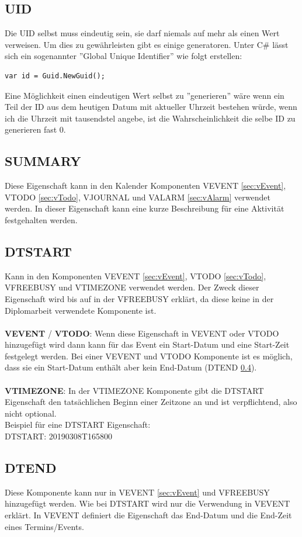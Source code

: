 \subsection{UID}
\label{sec:uid}
Die UID selbst muss eindeutig sein, sie darf niemals auf mehr als einen Wert verweisen. Um dies zu gewährleisten gibt es einige generatoren. Unter C\# lässt sich ein sogenannter ''Global Unique Identifier'' wie folgt erstellen: \\
\begin{lstlisting}[caption=GUID in C\#, label=lst:test]
var id = Guid.NewGuid(); 
\end{lstlisting}
Eine Möglichkeit einen eindeutigen Wert selbst zu ''generieren'' wäre wenn ein Teil der ID aus dem heutigen Datum mit aktueller Uhrzeit bestehen würde, wenn ich die Uhrzeit mit tausendstel angebe, ist die Wahrscheinlichkeit die selbe ID zu generieren fast 0. 
\subsection{SUMMARY}
\label{sec:summary}
Diese Eigenschaft kann in den Kalender Komponenten VEVENT \ref{sec:vEvent}, VTODO \ref{sec:vTodo}, VJOURNAL und VALARM \ref{sec:vAlarm} verwendet werden. In dieser Eigenschaft kann eine kurze Beschreibung für eine Aktivität festgehalten werden.
\subsection{DTSTART}
\label{sec:dtstart}
Kann in den Komponenten VEVENT \ref{sec:vEvent}, VTODO \ref{sec:vTodo}, VFREEBUSY und VTIMEZONE verwendet werden. Der Zweck dieser Eigenschaft wird bis auf in der VFREEBUSY erklärt, da diese keine in der Diplomarbeit verwendete Komponente ist. \\ \\ \textbf{VEVENT} / \textbf{VTODO}: Wenn diese Eigenschaft in VEVENT oder VTODO hinzugefügt wird dann kann für das Event ein Start-Datum und eine Start-Zeit festgelegt werden. Bei einer VEVENT und VTODO Komponente ist es möglich, dass sie ein Start-Datum enthält aber kein End-Datum (DTEND \ref{sec:dtend}). \\ \\ \textbf{VTIMEZONE}: In der VTIMEZONE Komponente gibt die DTSTART Eigenschaft den tatsächlichen Beginn einer Zeitzone an und ist verpflichtend, also nicht optional. \\
Beispiel für eine DTSTART Eigenschaft: \\
DTSTART: 20190308T165800
\subsection{DTEND}
\label{sec:dtend}
Diese Komponente kann nur in VEVENT \ref{sec:vEvent} und VFREEBUSY hinzugefügt werden. Wie bei DTSTART wird nur die Verwendung in VEVENT erklärt. In VEVENT definiert die Eigenschaft das End-Datum und die End-Zeit eines Termins/Events.
